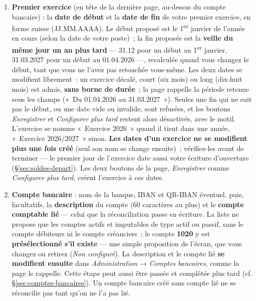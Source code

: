 \documentclass[a4paper,11pt,oneside]{article}
\begin{document}
\begin{enumerate}
    \item \textbf{Premier exercice} (en tête de la dernière page, au-dessus du compte bancaire) : la \textbf{date de début} et la \textbf{date de fin} de votre premier exercice, en forme suisse (JJ.MM.AAAA). Le début proposé est le 1\textsuperscript{er} janvier de l'année en cours (selon la date de votre poste)~; la fin proposée est la \textbf{veille du même jour un an plus tard} --- 31.12 pour un début au 1\textsuperscript{er} janvier, 31.03.2027 pour un début au 01.04.2026 ---, recalculée quand vous changez le début, tant que vous ne l'avez pas retouchée vous-même. Les deux dates se modifient librement~: un exercice décalé, court (six mois) ou long (dix-huit mois) est admis, \textbf{sans borne de durée}~; la page rappelle la période retenue sous les champs («~Du 01.04.2026 au 31.03.2027~»). Seules une fin qui ne suit pas le début, ou une date vide ou invalide, sont refusées, et les boutons \emph{Enregistrer} et \emph{Configurer plus tard} restent alors désactivés, avec le motif. L'exercice se nomme «~Exercice 2026~» quand il tient dans une année, «~Exercice 2026/2027~» sinon. \textbf{Les dates d'un exercice ne se modifient plus une fois créé} (seul son nom se change ensuite)~: vérifiez-les avant de terminer --- le premier jour de l'exercice date aussi votre écriture d'ouverture (\S\ref{sec:soldes-depart}). Les deux boutons de la page, \emph{Enregistrer} comme \emph{Configurer plus tard}, créent l'exercice à ces dates.
    \item \textbf{Compte bancaire} : nom de la banque, IBAN et QR-IBAN éventuel, puis, facultatifs, la \textbf{description} du compte (60 caractères au plus) et le \textbf{compte comptable lié} --- celui que la réconciliation passe en écriture. La liste ne propose que les comptes actifs et imputables de type actif ou passif, sans le compte débiteurs ni le compte créanciers~; le compte \textbf{1020} y est \textbf{présélectionné s'il existe} --- une simple proposition de l'écran, que vous changez ou retirez (\emph{Non configuré}). La description et le compte lié \textbf{se modifient ensuite} dans \emph{Administration} → \emph{Comptes bancaires}, comme la page le rappelle. Cette étape peut aussi être passée et complétée plus tard (cf. \S\ref{sec:comptes-bancaires}). Un compte bancaire créé sans compte lié ne se réconcilie pas tant qu'on ne l'a pas lié.
\end{enumerate}
\end{document}
